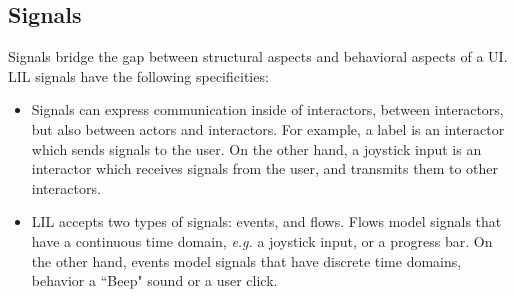 \documentclass{sigchi}
\begin{document}
\subsection{Signals}
Signals bridge the gap between structural aspects and behavioral aspects of a UI. LIL signals have the following specificities:
\begin{itemize}
\item Signals can express communication inside of interactors, between interactors, but also between actors and interactors. For example, a label is an interactor which sends signals to the user. On the other hand, a joystick input is an interactor which receives signals from the user, and transmits them to other interactors.
\item LIL accepts two types of signals: events, and flows. Flows model signals that have a continuous time domain, \textit{e.g.} a joystick input, or a progress bar. On the other hand, events model signals that have discrete time domains, behavior a ``Beep" sound or a user click.
\end{itemize}
\end{document}
